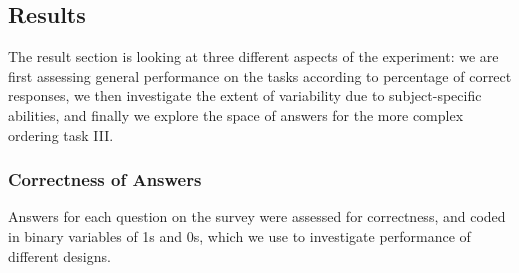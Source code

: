 \subsection{Results}
The result section is looking at three different aspects of the experiment: we are first assessing general performance on the tasks according to percentage of correct responses, we then investigate the extent of variability due to subject-specific abilities, and finally we explore the space of answers for the more complex ordering task III.
\subsubsection*{Correctness of Answers}
Answers for each question on the survey were assessed for correctness, and coded in binary variables of 1s and 0s, which we use to investigate performance of different designs. 





